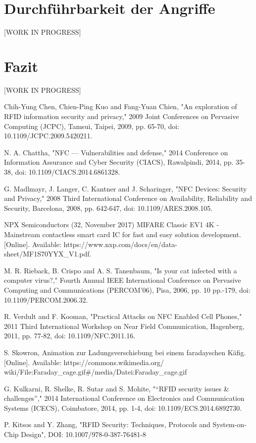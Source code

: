 \documentclass[conference]{IEEEtran}
\begin{document}
\section{Durchführbarkeit der Angriffe}
[WORK IN PROGRESS]

\section{Fazit}
[WORK IN PROGRESS]

\begin{thebibliography}{00}
 Chih-Yung Chen, Chien-Ping Kuo and Fang-Yuan Chien, "An exploration of RFID information security and privacy," 2009 Joint Conferences on Pervasive Computing (JCPC), Tamsui, Taipei, 2009, pp. 65-70, doi: 10.1109/JCPC.2009.5420211.

 N. A. Chattha, "NFC — Vulnerabilities and defense," 2014 Conference on Information Assurance and Cyber Security (CIACS), Rawalpindi, 2014, pp. 35-38, doi: 10.1109/CIACS.2014.6861328.

 G. Madlmayr, J. Langer, C. Kantner and J. Scharinger, "NFC Devices: Security and Privacy," 2008 Third International Conference on Availability, Reliability and Security, Barcelona, 2008, pp. 642-647, doi: 10.1109/ARES.2008.105.

 NPX Semiconductors (32, November 2017) MIFARE Classic EV1 4K - Mainstream contactless smart card IC for fast and easy solution development. [Online]. Available: https://www.nxp.com/docs/en/data-sheet/MF1S70YYX\_V1.pdf.

 M. R. Rieback, B. Crispo and A. S. Tanenbaum, "Is your cat infected with a computer virus?," Fourth Annual IEEE International Conference on Pervasive Computing and Communications (PERCOM'06), Pisa, 2006, pp. 10 pp.-179, doi: 10.1109/PERCOM.2006.32.

 R. Verdult and F. Kooman, "Practical Attacks on NFC Enabled Cell Phones," 2011 Third International Workshop on Near Field Communication, Hagenberg, 2011, pp. 77-82, doi: 10.1109/NFC.2011.16.

 S. Skowron, Animation zur Ladungsverschiebung bei einem faradayschen Käfig. [Online]. Available: https://commons.wikimedia.org/ wiki/File:Faraday\_cage.gif\#/media/Datei:Faraday\_cage.gif

 G. Kulkarni, R. Shelke, R. Sutar and S. Mohite, "“RFID security issues \& challenges”," 2014 International Conference on Electronics and Communication Systems (ICECS), Coimbatore, 2014, pp. 1-4, doi: 10.1109/ECS.2014.6892730.

 P. Kitsos and Y. Zhang, "RFID Security: Techniques, Protocols and System-on-Chip Design", DOI: 10.1007/978-0-387-76481-8

\end{thebibliography}
\end{document}
